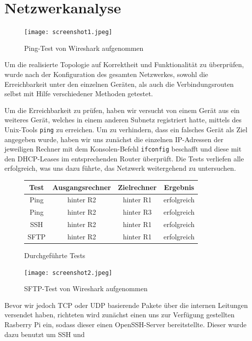 \documentclass[11pt,a4paper]{article}
\begin{document}
\section{Netzwerkanalyse}
\begin{figure}
\centering
\texttt{[image: screenshot1.jpeg]}
\caption{\footnotesize{Ping-Test von Wireshark aufgenommen}}
\end{figure}
Um die realisierte Topologie auf Korrektheit und Funktionalität zu
überprüfen, wurde nach der Konfiguration des gesamten Netzwerkes,
sowohl die Erreichbarkeit unter den einzelnen Geräten, als auch die
Verbindungsrouten selbst mit Hilfe verschiedener Methoden getestet.
\par
Um die Erreichbarkeit zu prüfen, haben wir versucht von einem Gerät
aus ein weiteres Gerät, welches in einem anderen Subnetz registriert
hatte, mittels des Unix-Tools \texttt{ping} zu erreichen. Um zu
verhindern, dass ein falsches Gerät als Ziel angegeben wurde, haben
wir uns zunächst die einzelnen IP-Adressen der jeweiligen Rechner mit
dem Konsolen-Befehl \texttt{ifconfig} beschafft und diese mit den
DHCP-Leases im entsprechenden Router überprüft. Die Tests verliefen
alle erfolgreich, was uns dazu führte, das Netzwerk weitergehend zu
untersuchen.
\begin{figure}[ht]
\begin{tabular}{|c|c|c|c|}
\hline 
Test & Ausgangsrechner & Zielrechner & Ergebnis \\ 
\hline 
Ping & hinter R2 & hinter R1 & erfolgreich \\ 
\hline 
Ping & hinter R2 & hinter R3 & erfolgreich \\ 
\hline 
SSH & hinter R2 & hinter R1 & erfolgreich \\ 
\hline 
SFTP & hinter R2 & hinter R1 & erfolgreich \\ 
\hline 
\end{tabular} 
  \centering
  \caption{Durchgeführte Tests}
\end{figure}
\par 
\begin{figure}
\centering
\texttt{[image: screenshot2.jpeg]}
\caption{\footnotesize{SFTP-Test von Wireshark aufgenommen}}
\end{figure}
Bevor wir jedoch TCP oder UDP basierende Pakete über die internen
Leitungen versendet haben, richteten wird zunächst einen uns zur
Verfügung gestellten Rasberry Pi ein, sodass dieser einen
OpenSSH-Server bereitstellte. Dieser wurde dazu benutzt um SSH und
\end{document}
